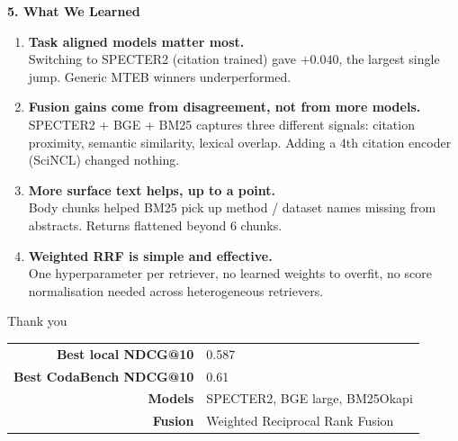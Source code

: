 \documentclass[aspectratio=169, 12pt]{beamer}
\begin{document}
\begin{frame}{\textbf{5. What We Learned}}
\begin{enumerate}
    \item \textbf{Task aligned models matter most.}\\
    \footnotesize Switching to SPECTER2 (citation trained) gave $+0.040$, the
    largest single jump. Generic MTEB winners underperformed.

    \vspace{0.5em}
    \item \textbf{Fusion gains come from disagreement, not from more models.}\\
    \footnotesize SPECTER2 + BGE + BM25 captures three different signals:
    citation proximity, semantic similarity, lexical overlap. Adding a 4th
    citation encoder (SciNCL) changed nothing.

    \vspace{0.5em}
    \item \textbf{More surface text helps, up to a point.}\\
    \footnotesize Body chunks helped BM25 pick up method / dataset names
    missing from abstracts. Returns flattened beyond 6 chunks.

    \vspace{0.5em}
    \item \textbf{Weighted RRF is simple and effective.}\\
    \footnotesize One hyperparameter per retriever, no learned weights to
    overfit, no score normalisation needed across heterogeneous retrievers.
\end{enumerate}
\end{frame}

\begin{frame}
\centering
\vspace{2cm}
{\Large Thank you}

\vspace{1.5cm}
\begin{tabular}{rl}
\textbf{Best local NDCG@10} & 0.587 \\
\textbf{Best CodaBench NDCG@10} & 0.61 \\
\textbf{Models} & SPECTER2, BGE large, BM25Okapi \\
\textbf{Fusion} & Weighted Reciprocal Rank Fusion \\
\end{tabular}
\end{frame}
\end{document}
